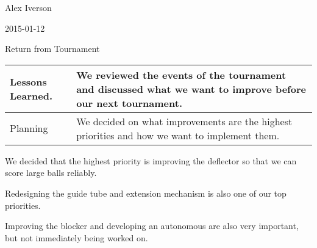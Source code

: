 Alex Iverson

2015-01-12

Return from Tournament

\begin{tabular}{|p{5cm}|p{5cm}|}
 \hline
 Lessons Learned. &
 We reviewed the events of the tournament and discussed what we want to improve before our next tournament.\\
 \hline
 Planning&
 We decided on what improvements are the highest priorities and how we want to implement them.\\
 \hline
\end{tabular}

We decided that the highest priority is improving the deflector so that we can score large balls reliably.

Redesigning the guide tube and extension mechanism is also one of our top priorities.

Improving the blocker and developing an autonomous are also very important, but not immediately being worked on.